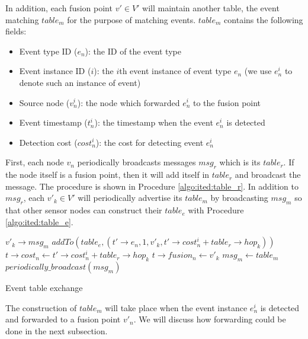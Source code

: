 In addition, each fusion point \(v'\in V'\) will maintain another table, the event matching \(table_m\) for the purpose of matching events. \(table_m\) contains the following fields:
\begin{itemize}
\item Event type ID (\(e_n\)): the ID of the event type
\item Event instance ID (\(i\)): the \(i\)th event instance of event type \(e_n\) (we use \(e_n^i\) to denote such an instance of event)
\item Source node (\(v_n^i\)): the node which forwarded \(e_n^i\) to the fusion point
\item Event timestamp (\(t_n^i\)): the timestamp when the event \(e_n^i\) is detected
\item Detection cost (\(cost_n^i\)): the cost for detecting event \(e_n^i\)
\end{itemize}

First, each node \(v_n\) periodically broadcasts messages \(msg_r\) which is its \(table_r\). If the node itself is a fusion point, then it will add itself in \(table_r\) and broadcast the message. The procedure is shown in Procedure \ref{algo:ited:table_r}. In addition to \(msg_r\), each \(v'_k\in V'\) will periodically advertise its \(table_m\) by broadcasting \(msg_m\) so that other sensor nodes can construct their \(table_e\) with Procedure \ref{algo:ited:table_e}.

\begin{algorithm}
\begin{algorithmic}
\REQUIRE \(v'_k\rightarrow msg_m\)
			\STATE \(addTo(table_e, (t'\rightarrow e_n, 1, v'_k, t'\rightarrow cost_n^i+table_r\rightarrow hop_k))\)
		\ENDIF
					\STATE \(t\rightarrow cost_n \gets t'\rightarrow cost_n^i+table_r\rightarrow hop_k\)
					\STATE \(t\rightarrow fusion_n \gets v'_k\)
				\ENDIF
			\ENDIF
		\ENDFOR
	\ENDFOR
		\STATE \(msg_m \gets table_m\)
		\STATE \(periodically\_broadcast(msg_m)\)
	\ENDIF
\end{algorithmic}
\caption{Event table exchange}
\label{algo:ited:table_e}
\end{algorithm}

The construction of \(table_m\) will take place when the event instance \(e_n^i\) is detected and forwarded to a fusion point \(v'_n\). We will discuss how forwarding could be done in the next subsection.

